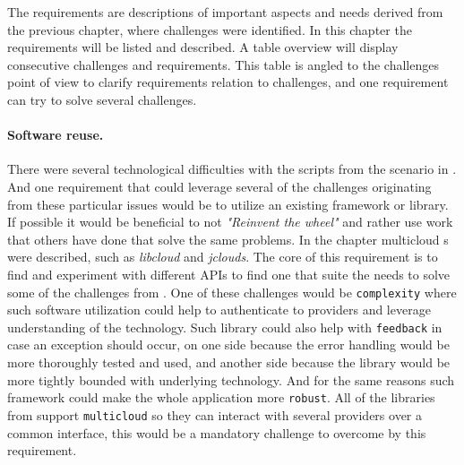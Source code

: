 

The requirements are descriptions of important aspects and needs derived from the previous chapter, 
 where challenges were identified.
In this chapter the requirements will be listed and described. A table overview will display
consecutive challenges and requirements. 
This table is angled to the challenges point of view to clarify requirements relation to challenges,
and one requirement can try to solve several challenges.

\paragraph{Software reuse.}
There were several technological difficulties with the scripts from the scenario in 
.
And one requirement that could leverage several of the challenges
originating from these particular issues would be to utilize an existing framework or library.
If possible it would be beneficial to not \emph{"Reinvent the wheel"} and rather use work
that others have done that solve the same problems.
In the chapter  multicloud s 
were described, such as \emph{libcloud} and \emph{jclouds}.
The core of this requirement is to find and experiment with different APIs to find one
that suite the needs to solve some of the challenges from .
One of these challenges would be \texttt{complexity} where such software utilization
could help to authenticate to providers and leverage understanding of the technology.
Such library could also help with \texttt{feedback} in case an exception should occur, on one
side because the error handling would be more thoroughly tested and used,
and another side because the library would be more tightly bounded with underlying technology.
And for the same reasons such framework could make the whole application more \texttt{robust}.
All of the libraries from  support \texttt{multicloud} so they can
interact with several providers over a common interface, this would be a mandatory challenge
to overcome by this requirement.

